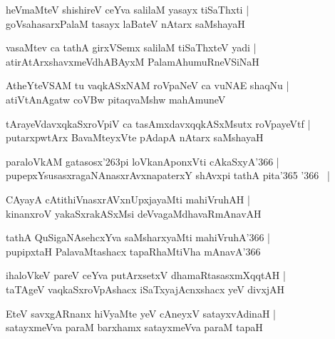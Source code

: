 \documentclass[twoside,12pt,openright]{book}
\def\S{\char'263}
\newcounter{shloka}[chapter]
\begin{document}
\begin{shloka}%
heVmaMteV shishireV ceYva salilaM yasayx tiSaThxti |\\
goVsahasarxPalaM tasayx laBateV nAtarx saMshayaH 
\end{shloka}

\begin{shloka}%
vasaMtev ca tathA girxVSemx salilaM tiSaThxteV yadi |\\
atirAtArxshavxmeVdhABAyxM PalamAhumuRneVSiNaH
\end{shloka}

\begin{shloka}%
AtheYteVSAM  tu vaqkASxNAM roVpaNeV ca vuNAE shaqNu |\\
atiVtAnAgatw coVBw pitaqvaMshw mahAmuneV 
\end{shloka}

\begin{shloka}%
tArayeVdavxqkaSxroVpiV ca tasAmxdavxqqkASxMsutx roVpayeVtf |\\
putarxpwtArx BavaMteyxVte pAdapA nAtarx saMshayaH
\end{shloka}

\begin{shloka}%
paraloVkAM gatasosx\S pi loVkanAponxVti cAkaSxyA\char'366 |\\
pupepxYsusasxragaNAnasxrAvxnapaterxY shAvxpi tathA pita\char'365 \char'366 ~|
\end{shloka}

\begin{shloka}%
CAyayA cAtithiVnasxrAVxnUpxjayaMti mahiVruhAH |\\
kinanxroV yakaSxrakASxMsi deVvagaMdhavaRmAnavAH
\end{shloka}

\begin{shloka}%
tathA QuSigaNAsehcxYva saMsharxyaMti mahiVruhA\char'366 |\\
pupipxtaH PalavaMtashacx tapaRhaMtiVha mAnavA\char'366 
\end{shloka}

\begin{shloka}%
ihaloVkeV pareV ceYva putArxsetxV dhamaRtasasxmXqqtAH |\\
taTAgeV vaqkaSxroVpAshacx iSaTxyajAcnxshacx yeV divxjAH 
\end{shloka}

\begin{shloka}%
EteV savxgARnanx hiVyaMte yeV cAneyxV satayxvAdinaH |\\
satayxmeVva paraM barxhamx satayxmeVva paraM tapaH 
\end{shloka}
\end{document}
